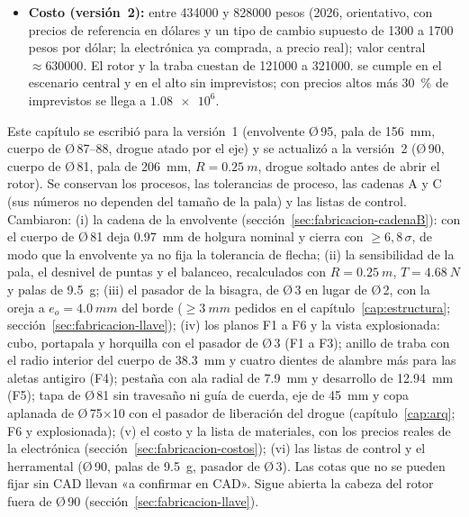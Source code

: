 \begin{resultado}
\begin{itemize}[leftmargin=*]
        retención; el superior va deslizante, para que la pila apretada por la tuerca no
        precargue los rodamientos. El juego axial del cubo es el interno del rodamiento
        fijo (\SIrange{0.01}{0.05}{mm}, valor supuesto); el huelgo cubo--tapa, de
        \SIrange{0.35}{0.94}{mm} en el peor caso.
  \item \textbf{Costo (versión~2):} entre \num{434000} y \num{828000} pesos (2026, orientativo, con
        precios de referencia en dólares y un tipo de cambio supuesto de 1300 a 1700
        pesos por dólar; la electrónica ya comprada, a precio real); valor central
        $\approx\num{630000}$. El rotor y la traba cuestan de \num{121000} a \num{321000}.
         se cumple en el escenario central y en el alto sin imprevistos; con precios
        altos más \SI{30}{\percent} de imprevistos se llega a $\num{1.08e6}$.
\end{itemize}
\end{resultado}

\begin{nota}
Este capítulo se escribió para la versión~1 (envolvente Ø\,95, pala de \SI{156}{mm}, cuerpo de
Ø\,87--88, drogue atado por el eje) y se actualizó a la versión~2 (Ø\,90, cuerpo de Ø\,81, pala de
\SI{206}{mm}, $R=\SI{0.25}{m}$, drogue soltado antes de abrir el rotor). Se conservan los procesos,
las tolerancias de proceso, las cadenas A y C (sus números no dependen del tamaño de la pala) y las
listas de control. Cambiaron: (i) la cadena de la envolvente (sección~\ref{sec:fabricacion-cadenaB}):
con el cuerpo de Ø\,81 deja \SI{0.97}{mm} de holgura nominal y cierra con $\ge6{,}8\,\sigma$, de modo que
la envolvente ya no fija la tolerancia de flecha; (ii) la sensibilidad de la pala, el desnivel de
puntas y el balanceo, recalculados con $R=\SI{0.25}{m}$, $T=\SI{4.68}{N}$ y palas de \SI{9.5}{g};
(iii) el pasador de la bisagra, de Ø\,3 en lugar de Ø\,2, con la oreja a $e_o=\SI{4.0}{mm}$ del borde
($\ge\SI{3}{mm}$ pedidos en el capítulo~\ref{cap:estructura}; sección~\ref{sec:fabricacion-llave});
(iv) los planos F1 a F6 y la vista explosionada: cubo, portapala y horquilla con el pasador de Ø\,3
(F1 a F3); anillo de traba con el radio interior del cuerpo de \SI{38.3}{mm} y cuatro dientes de alambre
más para las aletas antigiro (F4); pestaña con ala radial
de \SI{7.9}{mm} y desarrollo de \SI{12.94}{mm} (F5); tapa de Ø\,81 sin travesaño ni guía de cuerda, eje de
\SI{45}{mm} y copa aplanada de Ø\,75$\times$10 con el pasador de liberación del drogue
(capítulo~\ref{cap:arq}; F6 y explosionada); (v) el costo y la lista de materiales, con los precios
reales de la electrónica (sección~\ref{sec:fabricacion-costos}); (vi) las listas de control y el herramental
(Ø\,90, palas de \SI{9.5}{g}, pasador de Ø\,3). Las cotas que no se pueden fijar sin CAD llevan «a confirmar en
CAD». Sigue abierta la cabeza del rotor fuera de Ø\,90 (sección~\ref{sec:fabricacion-llave}).
\end{nota}

